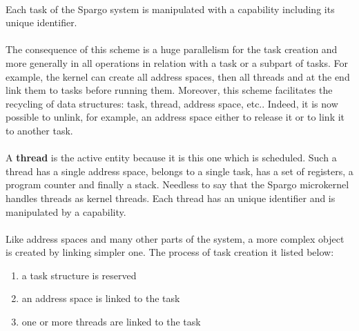 \documentclass[10pt,a4wide]{article}
\begin{document}
\begin{multicols}{2}
\paragraph{}

Each task of the Spargo system is manipulated with a capability including
its unique identifier.

\paragraph{}

The consequence of this scheme is a huge parallelism for the
task creation and more generally in all operations in relation with
a task or a subpart of tasks. For example, the kernel can create all
address spaces, then all threads and at the end link them to tasks before
running them. Moreover, this scheme facilitates the recycling of data
structures: task, thread, address space, etc.. Indeed, it is now possible to
unlink, for example, an address space either to release it or to link it to
another task.

\paragraph{}

A \textbf{thread} is the active entity because it is this one which is
scheduled. Such a thread has a single address space, belongs to a single
task, has a set of registers, a program counter and finally a stack.
Needless to say that the Spargo microkernel handles threads as kernel threads.
Each thread has an unique identifier and is manipulated by a capability.

\paragraph{}

Like address spaces and many other parts of the system, a more complex
object is created by linking simpler one. The process of task creation
it listed below:

\begin{enumerate}

\item a task structure is reserved

\item an address space is linked to the task

\item one or more threads are linked to the task


\end{enumerate}
\end{multicols}
\end{document}
